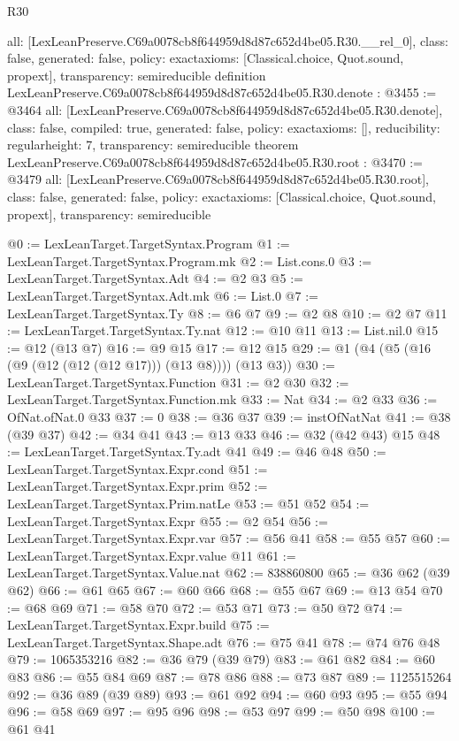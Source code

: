 \begin{lexlean}{R30}
\begin{coremodule}
{  all: [LexLeanPreserve.C69a0078cb8f644959d8d87c652d4be05.R30.__rel_0],
  class: false,
  generated: false,
  policy: exact{axioms: [Classical.choice, Quot.sound, propext]},
  transparency: semireducible
}
definition LexLeanPreserve.C69a0078cb8f644959d8d87c652d4be05.R30.denote : @3455 := @3464 {
  all: [LexLeanPreserve.C69a0078cb8f644959d8d87c652d4be05.R30.denote],
  class: false,
  compiled: true,
  generated: false,
  policy: exact{axioms: []},
  reducibility: regular{height: 7},
  transparency: semireducible
}
theorem LexLeanPreserve.C69a0078cb8f644959d8d87c652d4be05.R30.root : @3470 := @3479 {
  all: [LexLeanPreserve.C69a0078cb8f644959d8d87c652d4be05.R30.root],
  class: false,
  generated: false,
  policy: exact{axioms: [Classical.choice, Quot.sound, propext]},
  transparency: semireducible
}

@0 := LexLeanTarget.TargetSyntax.Program
@1 := LexLeanTarget.TargetSyntax.Program.mk
@2 := List.cons.{0}
@3 := LexLeanTarget.TargetSyntax.Adt
@4 := @2 @3
@5 := LexLeanTarget.TargetSyntax.Adt.mk
@6 := List.{0}
@7 := LexLeanTarget.TargetSyntax.Ty
@8 := @6 @7
@9 := @2 @8
@10 := @2 @7
@11 := LexLeanTarget.TargetSyntax.Ty.nat
@12 := @10 @11
@13 := List.nil.{0}
@15 := @12 (@13 @7)
@16 := @9 @15
@17 := @12 @15
@29 := @1 (@4 (@5 (@16 (@9 (@12 (@12 (@12 @17))) (@13 @8)))) (@13 @3))
@30 := LexLeanTarget.TargetSyntax.Function
@31 := @2 @30
@32 := LexLeanTarget.TargetSyntax.Function.mk
@33 := Nat
@34 := @2 @33
@36 := OfNat.ofNat.{0} @33
@37 := 0
@38 := @36 @37
@39 := instOfNatNat
@41 := @38 (@39 @37)
@42 := @34 @41
@43 := @13 @33
@46 := @32 (@42 @43) @15
@48 := LexLeanTarget.TargetSyntax.Ty.adt @41
@49 := @46 @48
@50 := LexLeanTarget.TargetSyntax.Expr.cond
@51 := LexLeanTarget.TargetSyntax.Expr.prim
@52 := LexLeanTarget.TargetSyntax.Prim.natLe
@53 := @51 @52
@54 := LexLeanTarget.TargetSyntax.Expr
@55 := @2 @54
@56 := LexLeanTarget.TargetSyntax.Expr.var
@57 := @56 @41
@58 := @55 @57
@60 := LexLeanTarget.TargetSyntax.Expr.value @11
@61 := LexLeanTarget.TargetSyntax.Value.nat
@62 := 838860800
@65 := @36 @62 (@39 @62)
@66 := @61 @65
@67 := @60 @66
@68 := @55 @67
@69 := @13 @54
@70 := @68 @69
@71 := @58 @70
@72 := @53 @71
@73 := @50 @72
@74 := LexLeanTarget.TargetSyntax.Expr.build
@75 := LexLeanTarget.TargetSyntax.Shape.adt
@76 := @75 @41
@78 := @74 @76 @48
@79 := 1065353216
@82 := @36 @79 (@39 @79)
@83 := @61 @82
@84 := @60 @83
@86 := @55 @84 @69
@87 := @78 @86
@88 := @73 @87
@89 := 1125515264
@92 := @36 @89 (@39 @89)
@93 := @61 @92
@94 := @60 @93
@95 := @55 @94
@96 := @58 @69
@97 := @95 @96
@98 := @53 @97
@99 := @50 @98
@100 := @61 @41

\end{coremodule}
\end{lexlean}
